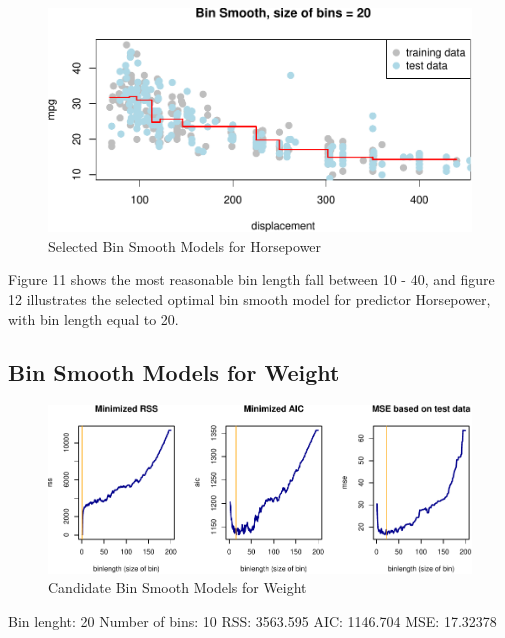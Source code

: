 \documentclass[]{article}
\begin{document}
\begin{figure}

{\centering \includegraphics{Report_files/figure-latex/bin-h-best-1} 

}

\caption{Selected Bin Smooth Models for Horsepower}\label{fig:bin-h-best}
\end{figure}

Figure 11 shows the most reasonable bin length fall between 10 - 40, and
figure 12 illustrates the selected optimal bin smooth model for
predictor Horsepower, with bin length equal to 20.

\hypertarget{bin-smooth-models-for-weight}{%
\subsection{Bin Smooth Models for
Weight}\label{bin-smooth-models-for-weight}}

\begin{figure}

{\centering \includegraphics{Report_files/figure-latex/bin-w-1} 

}

\caption{Candidate Bin Smooth Models for Weight}\label{fig:bin-w}
\end{figure}

Bin lenght: 20 Number of bins: 10 RSS: 3563.595 AIC: 1146.704 MSE:
17.32378
\end{document}
